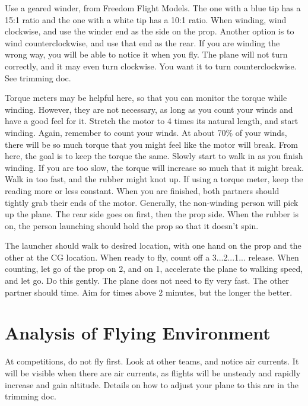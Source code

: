 \documentclass[twocolumn]{article}
\begin{document}
Use a geared winder, from Freedom Flight Models. The one with a blue tip has a 15:1 ratio and the one with a white tip has a 10:1 ratio. When winding, wind clockwise, and use the winder end as the side on the prop. Another option is to wind counterclockwise, and use that end as the rear. If you are winding the wrong way, you will be able to notice it when you fly. The plane will not turn correctly, and it may even turn clockwise. You want it to turn counterclockwise. See trimming doc. 

Torque meters may be helpful here, so that you can monitor the torque while winding. However, they are not necessary, as long as you count your winds and have a good feel for it. Stretch the motor to 4 times its natural length, and start winding. Again, remember to count your winds. At about 70\% of your winds, there will be so much torque that you might feel like the motor will break. From here, the goal is to keep the torque the same. Slowly start to walk in as you finish winding. If you are too slow, the torque will increase so much that it might break. Walk in too fast, and the rubber might knot up. If using a torque meter, keep the reading more or less constant. When you are finished, both partners should tightly grab their ends of the motor. Generally, the non-winding person will pick up the plane. The rear side goes on first, then the prop side. When the rubber is on, the person launching should hold the prop so that it doesn't spin. 

The launcher should walk to desired location, with one hand on the prop and the other at the CG location. When ready to fly, count off a 3...2...1... release. When counting, let go of the prop on 2, and on 1, accelerate the plane to walking speed, and let go. Do this gently. The plane does not need to fly very fast. The other partner should time. Aim for times above 2 minutes, but the longer the better. 
\section{Analysis of Flying Environment}
At competitions, do not fly first. Look at other teams, and notice air currents. It will be visible when there are air currents, as flights will be unsteady and rapidly increase and gain altitude. Details on how to adjust your plane to this are in the trimming doc. 
\end{document}
